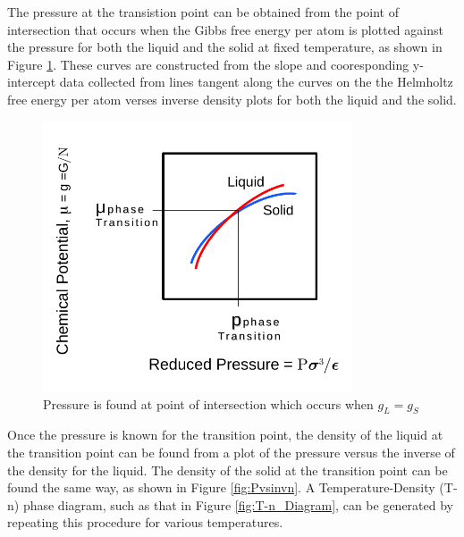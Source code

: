 \documentclass[double,12pt]{beavtex}
\begin{document}
The pressure at the transistion point can be obtained from the point of 
intersection that occurs when the Gibbs free energy per atom is plotted 
against the pressure for both the liquid and the solid at fixed temperature, 
as shown in Figure \ref{fig:GibbsvsP}. These curves are constructed from 
the slope and cooresponding y-intercept data collected from lines tangent 
along the curves on the the Helmholtz free energy per atom verses inverse 
density plots for both the liquid and the solid. 
\begin{figure}[h!]
    \centering
     \includegraphics[height=8cm]{figs/MaxwellDTC-Fig2.pdf}
    \caption{Pressure is found at point of intersection which occurs when $g_L=g_S$}
    \label{fig:GibbsvsP}
  \end{figure}

Once the pressure is known for the transition point, the density of the 
liquid at the transition point can be found from a plot of the pressure 
versus the inverse of the density for the liquid. The density of the solid 
at the transition point can be found the same way, as shown in Figure 
\ref{fig:Pvsinvn}. A Temperature-Density (T-n) phase diagram, such as 
that in Figure \ref{fig:T-n_Diagram}, can be generated by repeating this 
procedure for various temperatures. 
\end{document}
